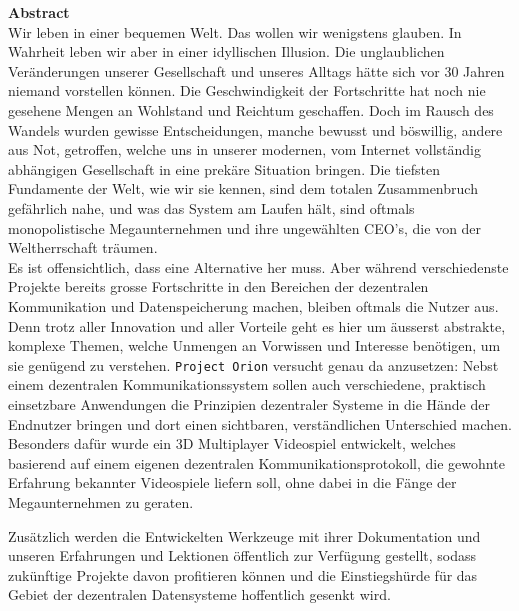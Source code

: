 \documentclass[11pt]{article}
\begin{document}
\newpage  
\begin{ABSTRACT}
\textbf{Abstract}\\
\noindent Wir leben in einer bequemen Welt. Das wollen wir wenigstens
glauben. In Wahrheit leben wir aber in einer idyllischen Illusion. Die
unglaublichen Veränderungen unserer Gesellschaft und unseres Alltags
hätte sich vor 30 Jahren niemand vorstellen können. Die
Geschwindigkeit der Fortschritte hat noch nie gesehene Mengen an
Wohlstand und Reichtum geschaffen. Doch im Rausch des Wandels wurden
gewisse Entscheidungen, manche bewusst und böswillig, andere aus Not,
getroffen, welche uns in unserer modernen, vom Internet vollständig
abhängigen Gesellschaft in eine prekäre Situation bringen. Die
tiefsten Fundamente der Welt, wie wir sie kennen, sind dem totalen
Zusammenbruch gefährlich nahe, und was das System am Laufen hält, sind
oftmals monopolistische Megaunternehmen und ihre ungewählten CEO's,
die von der Weltherrschaft träumen.\\

\noindent Es ist offensichtlich, dass eine Alternative her muss. Aber
während verschiedenste Projekte bereits grosse Fortschritte in den
Bereichen der dezentralen Kommunikation und Datenspeicherung machen,
bleiben oftmals die Nutzer aus. Denn trotz aller Innovation und aller
Vorteile geht es hier um äusserst abstrakte, komplexe Themen, welche
Unmengen an Vorwissen und Interesse benötigen, um sie genügend zu
verstehen. \texttt{Project Orion} versucht genau da anzusetzen: Nebst einem
dezentralen Kommunikationssystem sollen auch verschiedene, praktisch
einsetzbare Anwendungen die Prinzipien dezentraler Systeme in die
Hände der Endnutzer bringen und dort einen sichtbaren, verständlichen
Unterschied machen. Besonders dafür wurde ein 3D Multiplayer
Videospiel entwickelt, welches basierend auf einem eigenen dezentralen
Kommunikationsprotokoll, die gewohnte Erfahrung bekannter Videospiele
liefern soll, ohne dabei in die Fänge der Megaunternehmen zu geraten.

\noindent Zusätzlich werden die Entwickelten Werkzeuge mit ihrer
Dokumentation und unseren Erfahrungen und Lektionen öffentlich zur
Verfügung gestellt, sodass zukünftige Projekte davon profitieren
können und die Einstiegshürde für das Gebiet der dezentralen
Datensysteme hoffentlich gesenkt wird.
\end{ABSTRACT}
\newpage
\end{document}
